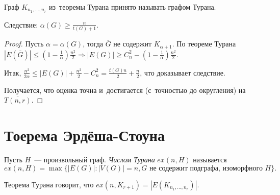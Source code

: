 \documentclass{article}
\begin{document}
Граф $K_{n_1,\ldots, n_r}$ из~теоремы Турана принято называть графом Турана.

\begin{claim}
Следствие: $\alpha(G) \ge \frac{n}{t(G) + 1}$.
\end{claim}
\begin{proof}
	Пусть $\alpha = \alpha(G)$, тогда $\overline{G}$ не содержит $K_{\alpha + 1}$.
	По теореме Турана $|E(\overline{G})| \le \left(1 - \frac{1}{\alpha}\right)
	\frac{n^2}{2} \Rightarrow |E(G)| \ge C_n^2 - \left(1 - \frac{1}{\alpha}\right)
	\frac{n^2}{2}$.

	Итак, $\frac{n^2}{2\alpha} \le |E(G)| + \frac{n^2}{2} - C_n^2 =
	\frac{t(G)n}{2} + \frac{n}{2}$, что доказывает следствие.

	Получается, что оценка точна и~достигается (с~точностью до округления) на
	$\overline{T(n,r)}$.
\end{proof}

\section{Тоерема Эрдёша-Стоуна}
Пусть $H$~--- произвольный граф. \emph{Числом Турана} $ex(n, H)$ называется
$$ex(n, H) = \max\{|E(G)|: |V(G)| = n, G \text{ не содержит подграфа,
изоморфного }H\}.$$

Теорема Турана говорит, что $ex(n, K_{r+1}) = |E(K_{n_1,\ldots,n_r})|$.
\end{document}
